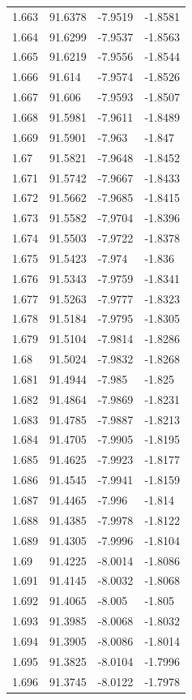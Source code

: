 \begin{tabular}{llll}
1.663 & 91.6378 & -7.9519 & -1.8581 \\
1.664 & 91.6299 & -7.9537 & -1.8563 \\
1.665 & 91.6219 & -7.9556 & -1.8544 \\
1.666 & 91.614 & -7.9574 & -1.8526 \\
1.667 & 91.606 & -7.9593 & -1.8507 \\
1.668 & 91.5981 & -7.9611 & -1.8489 \\
1.669 & 91.5901 & -7.963 & -1.847 \\
1.67 & 91.5821 & -7.9648 & -1.8452 \\
1.671 & 91.5742 & -7.9667 & -1.8433 \\
1.672 & 91.5662 & -7.9685 & -1.8415 \\
1.673 & 91.5582 & -7.9704 & -1.8396 \\
1.674 & 91.5503 & -7.9722 & -1.8378 \\
1.675 & 91.5423 & -7.974 & -1.836 \\
1.676 & 91.5343 & -7.9759 & -1.8341 \\
1.677 & 91.5263 & -7.9777 & -1.8323 \\
1.678 & 91.5184 & -7.9795 & -1.8305 \\
1.679 & 91.5104 & -7.9814 & -1.8286 \\
1.68 & 91.5024 & -7.9832 & -1.8268 \\
1.681 & 91.4944 & -7.985 & -1.825 \\
1.682 & 91.4864 & -7.9869 & -1.8231 \\
1.683 & 91.4785 & -7.9887 & -1.8213 \\
1.684 & 91.4705 & -7.9905 & -1.8195 \\
1.685 & 91.4625 & -7.9923 & -1.8177 \\
1.686 & 91.4545 & -7.9941 & -1.8159 \\
1.687 & 91.4465 & -7.996 & -1.814 \\
1.688 & 91.4385 & -7.9978 & -1.8122 \\
1.689 & 91.4305 & -7.9996 & -1.8104 \\
1.69 & 91.4225 & -8.0014 & -1.8086 \\
1.691 & 91.4145 & -8.0032 & -1.8068 \\
1.692 & 91.4065 & -8.005 & -1.805 \\
1.693 & 91.3985 & -8.0068 & -1.8032 \\
1.694 & 91.3905 & -8.0086 & -1.8014 \\
1.695 & 91.3825 & -8.0104 & -1.7996 \\
1.696 & 91.3745 & -8.0122 & -1.7978 \\

\end{tabular}
